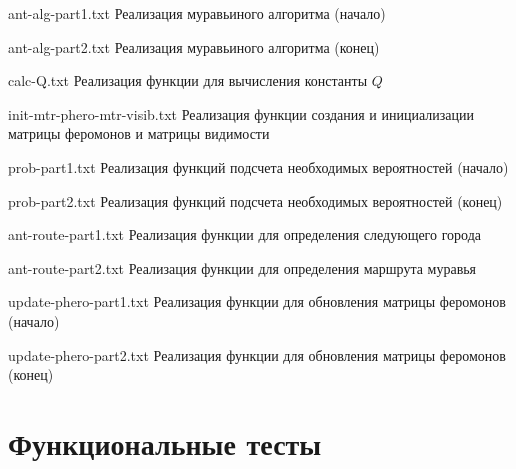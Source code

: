 {ant-alg-part1.txt} %
{Реализация муравьиного алгоритма (начало)} %

\clearpage

{ant-alg-part2.txt} %
{Реализация муравьиного алгоритма (конец)} %

{calc-Q.txt} %
{Реализация функции для вычисления константы $Q$} %

{init-mtr-phero-mtr-visib.txt} %
{Реализация функции создания и инициализации матрицы феромонов и матрицы видимости} %

{prob-part1.txt} %
{Реализация функций подсчета необходимых вероятностей (начало)} %

\clearpage

{prob-part2.txt} %
{Реализация функций подсчета необходимых вероятностей (конец)} %

{ant-route-part1.txt} %
{Реализация функции для определения следующего города} %

\clearpage

{ant-route-part2.txt} %
{Реализация функции для определения маршрута муравья} %

{update-phero-part1.txt} %
{Реализация функции для обновления матрицы феромонов (начало)} %

{update-phero-part2.txt} %
{Реализация функции для обновления матрицы феромонов (конец)} %

\section{Функциональные тесты}


